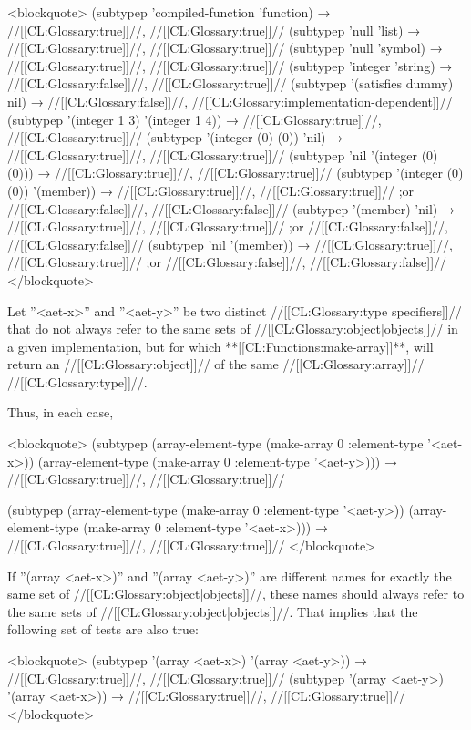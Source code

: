 <blockquote> (subtypep 'compiled-function 'function) → //[[CL:Glossary:true]]//, //[[CL:Glossary:true]]// (subtypep 'null 'list) → //[[CL:Glossary:true]]//, //[[CL:Glossary:true]]// (subtypep 'null 'symbol) → //[[CL:Glossary:true]]//, //[[CL:Glossary:true]]// (subtypep 'integer 'string) → //[[CL:Glossary:false]]//, //[[CL:Glossary:true]]// (subtypep '(satisfies dummy) nil) → //[[CL:Glossary:false]]//, //[[CL:Glossary:implementation-dependent]]// (subtypep '(integer 1 3) '(integer 1 4)) → //[[CL:Glossary:true]]//, //[[CL:Glossary:true]]// (subtypep '(integer (0) (0)) 'nil) → //[[CL:Glossary:true]]//, //[[CL:Glossary:true]]// (subtypep 'nil '(integer (0) (0))) → //[[CL:Glossary:true]]//, //[[CL:Glossary:true]]// (subtypep '(integer (0) (0)) '(member)) → //[[CL:Glossary:true]]//, //[[CL:Glossary:true]]// ;or //[[CL:Glossary:false]]//, //[[CL:Glossary:false]]// (subtypep '(member) 'nil) → //[[CL:Glossary:true]]//, //[[CL:Glossary:true]]// ;or //[[CL:Glossary:false]]//, //[[CL:Glossary:false]]// (subtypep 'nil '(member)) → //[[CL:Glossary:true]]//, //[[CL:Glossary:true]]// ;or //[[CL:Glossary:false]]//, //[[CL:Glossary:false]]// </blockquote>

Let ''<aet-x>'' and ''<aet-y>'' be two distinct //[[CL:Glossary:type specifiers]]// that do not always refer to the same sets of //[[CL:Glossary:object|objects]]// in a given implementation, but for which **[[CL:Functions:make-array]]**, will return an //[[CL:Glossary:object]]// of the same //[[CL:Glossary:array]]// //[[CL:Glossary:type]]//.

Thus, in each case,

<blockquote> (subtypep (array-element-type (make-array 0 :element-type '<aet-x>)) (array-element-type (make-array 0 :element-type '<aet-y>))) → //[[CL:Glossary:true]]//, //[[CL:Glossary:true]]//

(subtypep (array-element-type (make-array 0 :element-type '<aet-y>)) (array-element-type (make-array 0 :element-type '<aet-x>))) → //[[CL:Glossary:true]]//, //[[CL:Glossary:true]]// </blockquote>


If ''(array <aet-x>)'' and ''(array <aet-y>)'' are different names for exactly the same set of //[[CL:Glossary:object|objects]]//, these names should always refer to the same sets of //[[CL:Glossary:object|objects]]//. That implies that the following set of tests are also true:

<blockquote> (subtypep '(array <aet-x>) '(array <aet-y>)) → //[[CL:Glossary:true]]//, //[[CL:Glossary:true]]// (subtypep '(array <aet-y>) '(array <aet-x>)) → //[[CL:Glossary:true]]//, //[[CL:Glossary:true]]// </blockquote>


